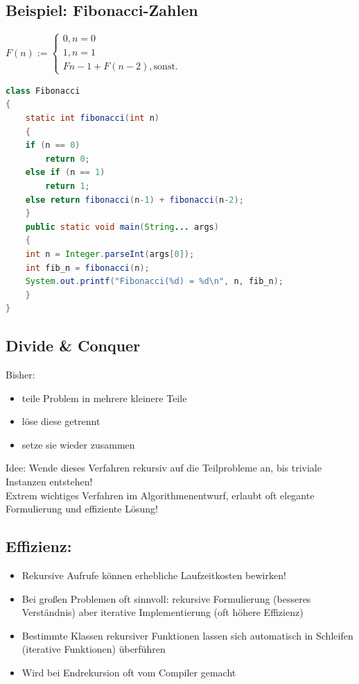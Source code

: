 \subsection{Beispiel: Fibonacci-Zahlen}
$F(n) := \left\{ \begin{array}{ll}
         0,n =0 &\\
         1,n =1 &\\
         F n − 1 + F(n − 2), \text{sonst}.\end{array} \right. 
$\\
\begin{lstlisting}[language=JAVA]
class Fibonacci
{
	static int fibonacci(int n)
	{
	if (n == 0)
		return 0;
	else if (n == 1)
		return 1;
	else return fibonacci(n-1) + fibonacci(n-2);
	}
	public static void main(String... args)
	{
	int n = Integer.parseInt(args[0]);
	int fib_n = fibonacci(n);
	System.out.printf("Fibonacci(%d) = %d\n", n, fib_n);
	}
}
\end{lstlisting}

\subsection{Divide \& Conquer}
Bisher:
\begin{itemize}
\item teile Problem in mehrere kleinere Teile
\item löse diese getrennt
\item setze sie wieder zusammen
\end{itemize}
Idee: Wende dieses Verfahren rekursiv auf die Teilprobleme an, bis triviale Instanzen entstehen!\\
Extrem wichtiges Verfahren im Algorithmenentwurf, erlaubt oft elegante Formulierung und effiziente Lösung!

\subsection{Effizienz:}
\begin{itemize}
\item Rekursive Aufrufe können erhebliche Laufzeitkosten bewirken!
\item Bei großen Problemen oft sinnvoll: rekursive Formulierung (besseres Verständnis) aber iterative Implementierung (oft höhere Effizienz)
\item Bestimmte Klassen rekursiver Funktionen lassen sich automatisch in Schleifen (iterative Funktionen) überführen
\item Wird bei Endrekursion oft vom Compiler gemacht
\end{itemize}

